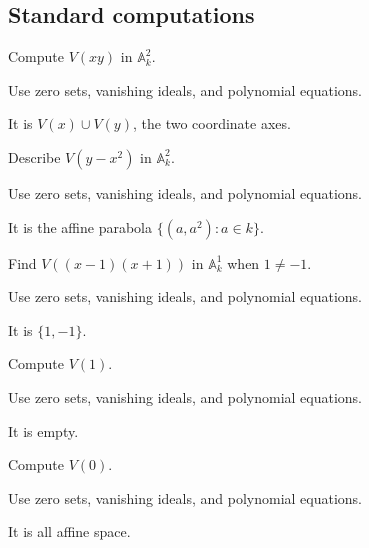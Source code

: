 \subsection*{Standard computations}

\begin{exercise}\label{exr:vi01-expand-01}
Compute $V(xy)$ in $\mathbb A^2_k$.
\end{exercise}
\begin{hint}
Use zero sets, vanishing ideals, and polynomial equations.
\end{hint}
\begin{solution}
It is $V(x)\cup V(y)$, the two coordinate axes.
\end{solution}

\begin{exercise}[Parabola]\label{exr:vi01-expand-02}
Describe $V(y-x^2)$ in $\mathbb A^2_k$.
\end{exercise}
\begin{hint}
Use zero sets, vanishing ideals, and polynomial equations.
\end{hint}
\begin{solution}
It is the affine parabola $\{(a,a^2):a\in k\}$.
\end{solution}

\begin{exercise}\label{exr:vi01-expand-03}
Find $V((x-1)(x+1))$ in $\mathbb A^1_k$ when $1\ne-1$.
\end{exercise}
\begin{hint}
Use zero sets, vanishing ideals, and polynomial equations.
\end{hint}
\begin{solution}
It is $\{1,-1\}$.
\end{solution}

\begin{exercise}\label{exr:vi01-expand-04}
Compute $V(1)$.
\end{exercise}
\begin{hint}
Use zero sets, vanishing ideals, and polynomial equations.
\end{hint}
\begin{solution}
It is empty.
\end{solution}

\begin{exercise}\label{exr:vi01-expand-05}
Compute $V(0)$.
\end{exercise}
\begin{hint}
Use zero sets, vanishing ideals, and polynomial equations.
\end{hint}
\begin{solution}
It is all affine space.
\end{solution}

